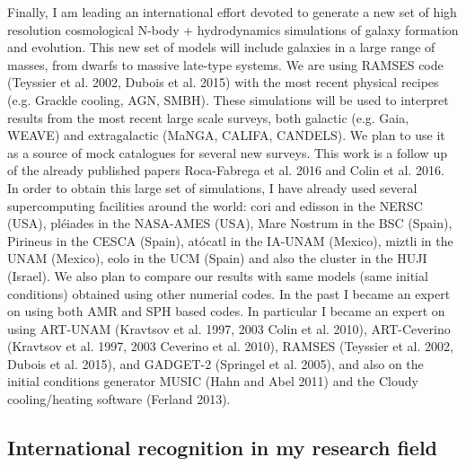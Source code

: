 \documentclass[oneside, a4paper, onecolumn, 11pt]{article}
\begin{document}
{Finally, I am leading an international effort devoted to generate a new set of high resolution cosmological N-body + hydrodynamics simulations of galaxy formation and evolution. This new set of models will include galaxies in a large range of masses, from dwarfs to massive late-type systems. We are using RAMSES code (Teyssier et al. 2002, Dubois et al. 2015) with the most recent physical recipes (e.g. Grackle cooling, AGN, SMBH). These simulations will be used to interpret results from the most recent large scale surveys, both galactic (e.g. Gaia, WEAVE) and extragalactic (MaNGA, CALIFA, CANDELS). We plan to use it as a source of mock catalogues for several new surveys. This work is a follow up of the already published papers Roca-Fabrega et al. 2016 and Colin et al. 2016. In order to obtain this large set of simulations, I have already used several supercomputing facilities around the world: cori and edisson in the NERSC (USA), pléiades in the NASA-AMES (USA), Mare Nostrum in the BSC (Spain), Pirineus in the CESCA (Spain), atócatl in the IA-UNAM (Mexico), miztli in the UNAM (Mexico), eolo in the UCM (Spain) and also the cluster in the HUJI (Israel). We also plan to compare our results with same models (same initial conditions) obtained using other numerial codes. In the past I became an expert on using both AMR and SPH based codes. In particular I became an expert on using ART-UNAM (Kravtsov et al. 1997, 2003 Colin et al. 2010), ART-Ceverino (Kravtsov et al. 1997, 2003 Ceverino et al. 2010), RAMSES (Teyssier et al. 2002, Dubois et al. 2015), and GADGET-2 (Springel et al. 2005), and also on the initial conditions generator MUSIC (Hahn and Abel 2011) and the Cloudy cooling/heating software (Ferland 2013).\\

\subsection*{International  recognition  in  my  research  field}\\

}
\end{document}
